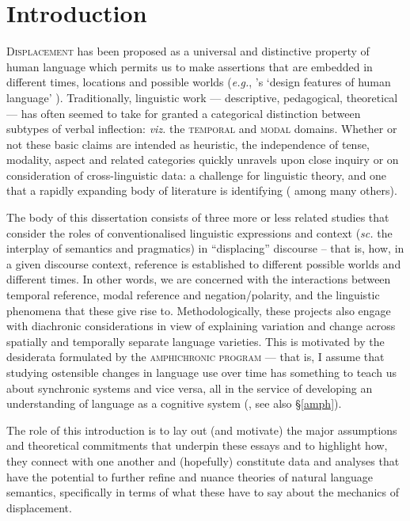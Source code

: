 \documentclass[11pt,dvipsnames]{report}
\begin{document}
\doublespacing

\chapter{Introduction}
%
\label{IntroCh}
\lettrine{D}{isplacement} has been proposed as a universal and distinctive property of human language which permits us to make assertions that are embedded in different times, locations and possible worlds (\textit{e.g.}, \citeauthor{Hockett1960}'s `design features of human language' \citeyear[90]{Hockett1960}). Traditionally, linguistic work --- descriptive, pedagogical, theoretical --- has often seemed to take for granted a categorical distinction between subtypes of verbal inflection: \textit{viz.} the \textsc{temporal} and \textsc{modal} domains. Whether or not these basic claims are intended as heuristic, the independence of tense, modality, aspect and related categories quickly unravels upon close inquiry or on consideration of cross-linguistic data: a challenge for linguistic theory, and one that a rapidly expanding body of literature is identifying  (\citealp[\textit{e.g.},][]{Condoravdi2002,Laca2012,Hacquard2006,Rullmann2018} among many others).


The body of this dissertation consists of three more or less related studies that consider the roles of conventionalised linguistic expressions and context (\textit{sc.} the interplay of semantics and pragmatics) in ``displacing'' discourse -- that is, how, in a given discourse context, reference is established to different possible worlds and different times. In other words, we are concerned with the interactions between temporal reference, modal reference and negation/polarity, and the linguistic phenomena that these give rise to. Methodologically, these projects also engage with diachronic considerations in view of explaining variation and change across spatially and temporally separate language varieties. This is motivated by the desiderata formulated by the \textsc{amphichronic program} --- that is, I assume that studying ostensible changes in language use over time has something to teach us about synchronic systems and vice versa, all in the service of developing an understanding of language as a cognitive system (\citealp[\textit{e.g.},][]{Kiparsky2006,Deo2015,Anderson2016a}, see also \S\thinspace\ref{amph}).

The role of this introduction is to lay out (and motivate) the major assumptions and theoretical commitments that underpin these essays and to highlight how, they connect with one another and (hopefully) constitute data and analyses that have the potential to further refine and nuance theories of natural language semantics, specifically in terms of what these have to say about the mechanics of displacement.
\end{document}
